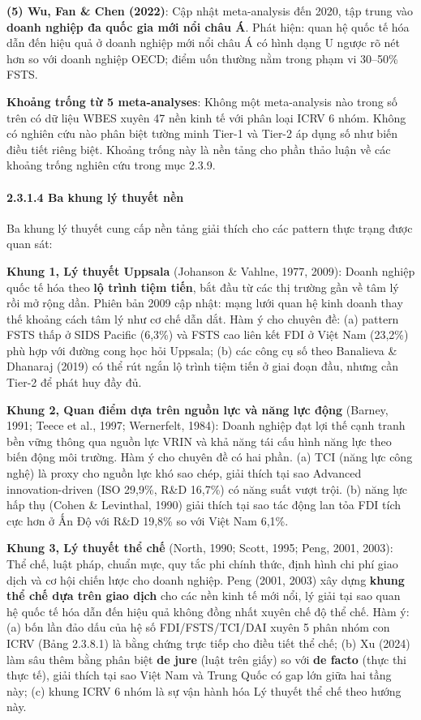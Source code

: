\documentclass[12pt,a4paper]{article}
\begin{document}
\textbf{(5) Wu, Fan \& Chen (2022)}: Cập nhật meta-analysis đến 2020,
tập trung vào \textbf{doanh nghiệp đa quốc gia mới nổi châu Á}. Phát
hiện: quan hệ quốc tế hóa dẫn đến hiệu quả ở doanh nghiệp mới nổi châu Á
có hình dạng U ngược rõ nét hơn so với doanh nghiệp OECD; điểm uốn
thường nằm trong phạm vi 30--50\% FSTS.

\textbf{Khoảng trống từ 5 meta-analyses}: Không một meta-analysis nào
trong số trên có dữ liệu WBES xuyên 47 nền kinh tế với phân loại ICRV 6
nhóm. Không có nghiên cứu nào phân biệt tường minh Tier-1 và Tier-2 áp
dụng số như biến điều tiết riêng biệt. Khoảng trống này là nền tảng cho
phần thảo luận về các khoảng trống nghiên cứu trong mục 2.3.9.

\hypertarget{2314-ba-khung-luxfd-thuyux1ebft-nux1ec1n}{%
\paragraph{2.3.1.4 Ba khung lý thuyết
nền}\label{2314-ba-khung-luxfd-thuyux1ebft-nux1ec1n}}

Ba khung lý thuyết cung cấp nền tảng giải thích cho các pattern thực
trạng được quan sát:

\textbf{Khung 1, Lý thuyết Uppsala} (Johanson \& Vahlne, 1977, 2009):
Doanh nghiệp quốc tế hóa theo \textbf{lộ trình tiệm tiến}, bắt đầu từ
các thị trường gần về tâm lý rồi mở rộng dần. Phiên bản 2009 cập nhật:
mạng lưới quan hệ kinh doanh thay thế khoảng cách tâm lý như cơ chế dẫn
dắt. Hàm ý cho chuyên đề: (a) pattern FSTS thấp ở SIDS Pacific (6,3\%)
và FSTS cao liên kết FDI ở Việt Nam (23,2\%) phù hợp với đường cong học
hỏi Uppsala; (b) các công cụ số theo Banalieva \& Dhanaraj (2019) có thể
rút ngắn lộ trình tiệm tiến ở giai đoạn đầu, nhưng cần Tier-2 để phát
huy đầy đủ.

\textbf{Khung 2, Quan điểm dựa trên nguồn lực và năng lực động} (Barney,
1991; Teece et al., 1997; Wernerfelt, 1984): Doanh nghiệp đạt lợi thế
cạnh tranh bền vững thông qua nguồn lực VRIN và khả năng tái cấu hình
năng lực theo biến động môi trường. Hàm ý cho chuyên đề có hai phần. (a)
TCI (năng lực công nghệ) là proxy cho nguồn lực khó sao chép, giải thích
tại sao Advanced innovation-driven (ISO 29,9\%, R\&D 16,7\%) có năng
suất vượt trội. (b) năng lực hấp thụ (Cohen \& Levinthal, 1990) giải
thích tại sao tác động lan tỏa FDI tích cực hơn ở Ấn Độ với R\&D 19,8\%
so với Việt Nam 6,1\%.

\textbf{Khung 3, Lý thuyết thể chế} (North, 1990; Scott, 1995; Peng,
2001, 2003): Thể chế, luật pháp, chuẩn mực, quy tắc phi chính thức, định
hình chi phí giao dịch và cơ hội chiến lược cho doanh nghiệp. Peng
(2001, 2003) xây dựng \textbf{khung thể chế dựa trên giao dịch} cho các
nền kinh tế mới nổi, lý giải tại sao quan hệ quốc tế hóa dẫn đến hiệu
quả không đồng nhất xuyên chế độ thể chế. Hàm ý: (a) bốn lần đảo dấu của
hệ số FDI/FSTS/TCI/DAI xuyên 5 phân nhóm con ICRV (Bảng 2.3.8.1) là bằng
chứng trực tiếp cho điều tiết thể chế; (b) Xu (2024) làm sâu thêm bằng
phân biệt \textbf{de jure} (luật trên giấy) so với \textbf{de facto}
(thực thi thực tế), giải thích tại sao Việt Nam và Trung Quốc có gap lớn
giữa hai tầng này; (c) khung ICRV 6 nhóm là sự vận hành hóa Lý thuyết
thể chế theo hướng này.
\end{document}
